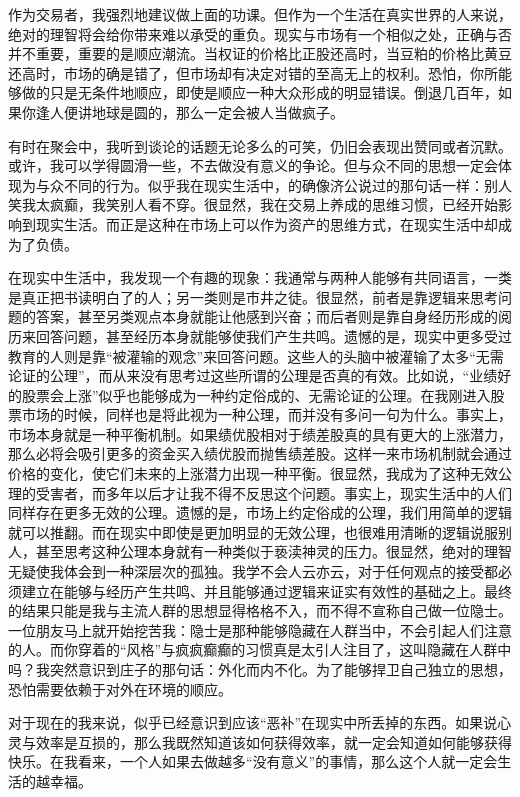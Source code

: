 作为交易者，我强烈地建议做上面的功课。但作为一个生活在真实世界的人来说，绝对的理智将会给你带来难以承受的重负。现实与市场有一个相似之处，正确与否并不重要，重要的是顺应潮流。当权证的价格比正股还高时，当豆粕的价格比黄豆还高时，市场的确是错了，但市场却有决定对错的至高无上的权利。恐怕，你所能够做的只是无条件地顺应，即使是顺应一种大众形成的明显错误。倒退几百年，如果你逢人便讲地球是圆的，那么一定会被人当做疯子。

有时在聚会中，我听到谈论的话题无论多么的可笑，仍旧会表现出赞同或者沉默。或许，我可以学得圆滑一些，不去做没有意义的争论。但与众不同的思想一定会体现为与众不同的行为。似乎我在现实生活中，的确像济公说过的那句话一样：别人笑我太疯癫，我笑别人看不穿。很显然，我在交易上养成的思维习惯，已经开始影响到现实生活。而正是这种在市场上可以作为资产的思维方式，在现实生活中却成为了负债。

在现实中生活中，我发现一个有趣的现象：我通常与两种人能够有共同语言，一类是真正把书读明白了的人；另一类则是市井之徒。很显然，前者是靠逻辑来思考问题的答案，甚至另类观点本身就能让他感到兴奋；而后者则是靠自身经历形成的阅历来回答问题，甚至经历本身就能够使我们产生共鸣。遗憾的是，现实中更多受过教育的人则是靠“被灌输的观念”来回答问题。这些人的头脑中被灌输了太多“无需论证的公理”，而从来没有思考过这些所谓的公理是否真的有效。比如说，“业绩好的股票会上涨”似乎也能够成为一种约定俗成的、无需论证的公理。在我刚进入股票市场的时候，同样也是将此视为一种公理，而并没有多问一句为什么。事实上，市场本身就是一种平衡机制。如果绩优股相对于绩差股真的具有更大的上涨潜力，那么必将会吸引更多的资金买入绩优股而抛售绩差股。这样一来市场机制就会通过价格的变化，使它们未来的上涨潜力出现一种平衡。很显然，我成为了这种无效公理的受害者，而多年以后才让我不得不反思这个问题。事实上，现实生活中的人们同样存在更多无效的公理。遗憾的是，市场上约定俗成的公理，我们用简单的逻辑就可以推翻。而在现实中即使是更加明显的无效公理，也很难用清晰的逻辑说服别人，甚至思考这种公理本身就有一种类似于亵渎神灵的压力。很显然，绝对的理智无疑使我体会到一种深层次的孤独。我学不会人云亦云，对于任何观点的接受都必须建立在能够与经历产生共鸣、并且能够通过逻辑来证实有效性的基础之上。最终的结果只能是我与主流人群的思想显得格格不入，而不得不宣称自己做一位隐士。一位朋友马上就开始挖苦我：隐士是那种能够隐藏在人群当中，不会引起人们注意的人。而你穿着的“风格”与疯疯癫癫的习惯真是太引人注目了，这叫隐藏在人群中吗？我突然意识到庄子的那句话：外化而内不化。为了能够捍卫自己独立的思想，恐怕需要依赖于对外在环境的顺应。

对于现在的我来说，似乎已经意识到应该“恶补”在现实中所丢掉的东西。如果说心灵与效率是互损的，那么我既然知道该如何获得效率，就一定会知道如何能够获得快乐。在我看来，一个人如果去做越多“没有意义”的事情，那么这个人就一定会生活的越幸福。

